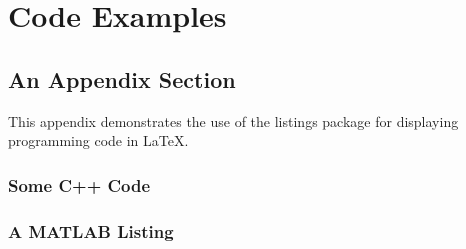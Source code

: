 % 
%
\chapter{Code Examples}

\section{An Appendix Section}

This appendix demonstrates the use of the listings package for displaying programming code in \LaTeX.

\subsection{Some C++ Code}

\lstset{language=C++}


\subsection{A MATLAB Listing}

\lstset{language=Matlab}

